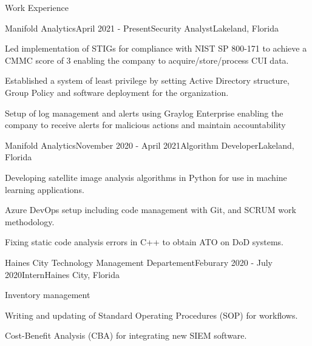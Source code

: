 \documentclass{resume} %
\begin{document}


\begin{rSection}{Work Experience}

	\begin{rSubsection}{Manifold Analytics}{April 2021 - Present}{Security Analyst}{Lakeland, Florida}
		\item Led implementation of STIGs for compliance with NIST SP 800-171 to achieve a CMMC score of 3 enabling the company to acquire/store/process CUI data.
		\item Established a system of least privilege by setting Active Directory structure, Group Policy and software deployment for the organization.
		\item Setup of log management and alerts using Graylog Enterprise enabling the company to receive alerts for malicious actions and maintain accountability
	\end{rSubsection}
	
	\begin{rSubsection}{Manifold Analytics}{November 2020 - April 2021}{Algorithm Developer}{Lakeland, Florida}
		\item Developing satellite image analysis algorithms in Python for use in machine learning applications.
		\item Azure DevOps setup including code management with Git, and SCRUM work methodology.
		\item Fixing static code analysis errors in C++ to obtain ATO on DoD systems. 
	\end{rSubsection}

	\begin{rSubsection}{Haines City Technology Management Departement}{Feburary 2020 - July 2020}{Intern}{Haines City, Florida}
		\item Inventory management
		\item Writing and updating of Standard Operating Procedures (SOP) for workflows. 
		\item Cost-Benefit Analysis (CBA) for integrating new SIEM software.
	\end{rSubsection}
	
	

\end{rSection}
\end{document}

